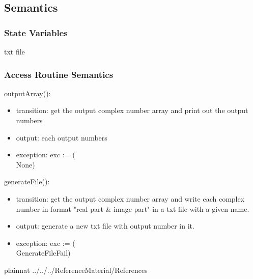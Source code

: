 \documentclass[12pt, titlepage]{article}
\begin{document}
\subsection{Semantics}

\subsubsection{State Variables}
txt file


\subsubsection{Access Routine Semantics}
outputArray():
\begin{itemize}
\item transition: get the output complex number array and print out the output numbers
\item output:  each output numbers
\item exception: exc := (\\
None)
\end{itemize}
generateFile():

\begin{itemize}
\item transition: get the output complex number array and write each complex number in format "real part \& image part" in a txt file with a given name.
\item output:  generate a new txt file with output number in it.
\item exception: exc := (\\
GenerateFileFail)
\end{itemize}



\newpage

 {plainnat}
 {../../../ReferenceMaterial/References}


\newpage
\end{document}
